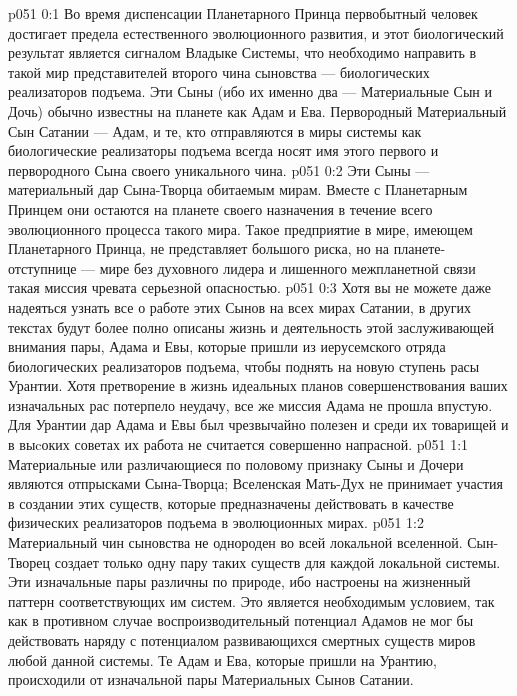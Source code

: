 \author{Вторичный Сын\hyp{}Ланонандек}
\vs p051 0:1 Во время диспенсации Планетарного Принца первобытный человек достигает предела естественного эволюционного развития, и этот биологический результат является сигналом Владыке Системы, что необходимо направить в такой мир представителей второго чина сыновства --- биологических реализаторов подъема. Эти Сыны (ибо их именно два --- Материальные Сын и Дочь) обычно известны на планете как Адам и Ева. Первородный Материальный Сын Сатании --- Адам, и те, кто отправляются в миры системы как биологические реализаторы подъема всегда носят имя этого первого и первородного Сына своего уникального чина.
\vs p051 0:2 Эти Сыны --- материальный дар Сына\hyp{}Творца обитаемым мирам. Вместе с Планетарным Принцем они остаются на планете своего назначения в течение всего эволюционного процесса такого мира. Такое предприятие в мире, имеющем Планетарного Принца, не представляет большого риска, но на планете\hyp{}отступнице --- мире без духовного лидера и лишенного межпланетной связи такая миссия чревата серьезной опасностью.
\vs p051 0:3 Хотя вы не можете даже надеяться узнать все о работе этих Сынов на всех мирах Сатании, в других текстах будут более полно описаны жизнь и деятельность этой заслуживающей внимания пары, Адама и Евы, которые пришли из иерусемского отряда биологических реализаторов подъема, чтобы поднять на новую ступень расы Урантии. Хотя претворение в жизнь идеальных планов совершенствования ваших изначальных рас потерпело неудачу, все же миссия Адама не прошла впустую. Для Урантии дар Адама и Евы был чрезвычайно полезен и среди их товарищей и в выcоких советах их работа не считается совершенно напрасной.
\vs p051 1:1 Материальные или различающиеся по половому признаку Сыны и Дочери являются отпрысками Сына\hyp{}Творца; Вселенская Мать\hyp{}Дух не принимает участия в создании этих существ, которые предназначены действовать в качестве физических реализаторов подъема в эволюционных мирах.
\vs p051 1:2 Материальный чин сыновства не однороден во всей локальной вселенной. Сын\hyp{}Творец создает только одну пару таких существ для каждой локальной системы. Эти изначальные пары различны по природе, ибо настроены на жизненный паттерн соответствующих им систем. Это является необходимым условием, так как в противном случае воспроизводительный потенциал Адамов не мог бы действовать наряду с потенциалом развивающихся смертных существ миров любой данной системы. Те Адам и Ева, которые пришли на Урантию, происходили от изначальной пары Материальных Сынов Сатании.
